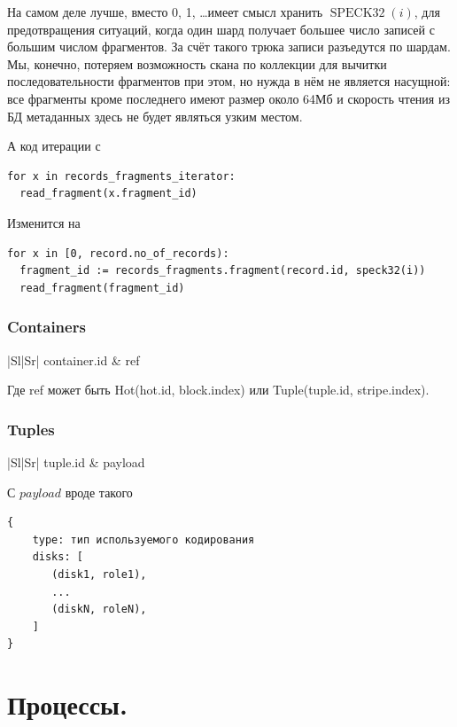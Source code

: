 \documentclass[a4paper,12pt]{article}
\begin{document}
\bigskip
На самом деле лучше, вместо 0, 1, \dots имеет смысл хранить $\operatorname{SPECK32}(i)$, для предотвращения
ситуаций, когда один шард получает большее число записей с большим числом фрагментов. За счёт такого трюка
записи разъедутся по шардам. Мы, конечно, потеряем возможность скана по коллекции для вычитки последовательности
фрагментов при этом, но нужда в нём не является насущной: все фрагменты кроме последнего имеют размер около
64Мб и скорость чтения из БД метаданных здесь не будет являться узким местом.

А код итерации с
\begin{lstlisting}
for x in records_fragments_iterator:
  read_fragment(x.fragment_id)
\end{lstlisting}
Изменится на
\begin{lstlisting}
for x in [0, record.no_of_records):
  fragment_id := records_fragments.fragment(record.id, speck32(i))
  read_fragment(fragment_id)
\end{lstlisting}

\subsubsection{Containers}

\begin{tabular}{|Sl|Sr|}
  \hline
  container.id & ref \\
  \hline
\end{tabular}

\bigskip
Где ref может быть Hot(hot.id, block.index) или Tuple(tuple.id, stripe.index).

\subsubsection{Tuples}

\begin{tabular}{|Sl|Sr|}
  \hline
  tuple.id & payload \\
  \hline
\end{tabular}

\bigskip
С $payload$ вроде такого
\begin{lstlisting}
{
    type: тип используемого кодирования
    disks: [
       (disk1, role1),
       ...
       (diskN, roleN),
    ]
}
\end{lstlisting}


\newpage
\section{Процессы.}
\end{document}
